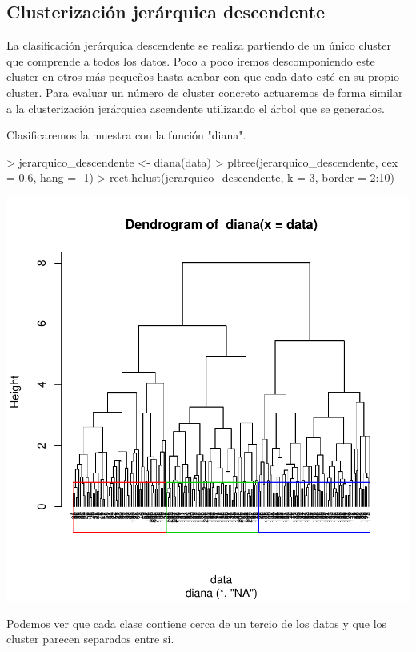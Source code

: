 \documentclass [a4paper] {article}
\begin{document}
\newpage
\subsection{Clusterización jerárquica descendente}
La clasificación jerárquica descendente se realiza partiendo de un único cluster que comprende a todos los datos.
Poco a poco iremos descomponiendo este cluster en otros más pequeños hasta acabar con que cada dato esté en su propio cluster.
Para evaluar un número de cluster concreto actuaremos de forma similar a la clusterización jerárquica ascendente utilizando el árbol que se generados.

Clasificaremos la muestra con la función "diana".
\begin{center}
\begin{Schunk}
\begin{Sinput}
> jerarquico_descendente <- diana(data)
> pltree(jerarquico_descendente, cex = 0.6, hang = -1)
> rect.hclust(jerarquico_descendente, k = 3, border = 2:10)
\end{Sinput}
\end{Schunk}
\includegraphics{entrega-jerarquico_descendente}
\end{center}
Podemos ver que cada clase contiene cerca de un tercio de los datos y que los cluster parecen separados entre si.
\end{document}
